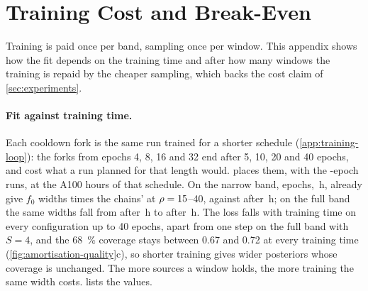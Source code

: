 \clearpage
\section{Training Cost and Break-Even}
\label{app:amortisation}

Training is paid once per band, sampling once per window. This appendix shows how the fit depends on
the training time and after how many windows the training is repaid by the cheaper sampling, which backs
the cost claim of \cref{sec:experiments}.

\paragraph{Fit against training time.}
Each cooldown fork is the same run trained for a shorter schedule (\cref{app:training-loop}): the
forks from epochs 4, 8, 16 and 32 end after 5, 10, 20 and 40 epochs, and cost what a run planned
for that length would.  places them, with the \ResultsEpochs{}-epoch
runs, at the A100 hours of that schedule. On the narrow band, \AmortisationNarrowShortEpochs{}
epochs, \AmortisationNarrowShortHours\,h, already give $f_0$ widths
\AmortisationNarrowShortRatio{} times the chains' at $\rho=15$--40, against
\AmortisationNarrowLongRatio{} after \AmortisationNarrowLongHours\,h; on the full band the same
widths fall from \AmortisationFullShortRatio{} after \AmortisationFullShortHours\,h to
\AmortisationFullLongRatio{} after \AmortisationFullLongHours\,h. The loss falls with training time on every
configuration up to 40 epochs, apart from one step on the full band with $S=4$, and the
\qty{68}{\percent} coverage stays between 0.67 and 0.72 at every training time
(\cref{fig:amortisation-quality}c), so shorter training gives wider posteriors whose coverage is
unchanged. The more sources a window holds,
the more training the same width costs.  lists the values.

